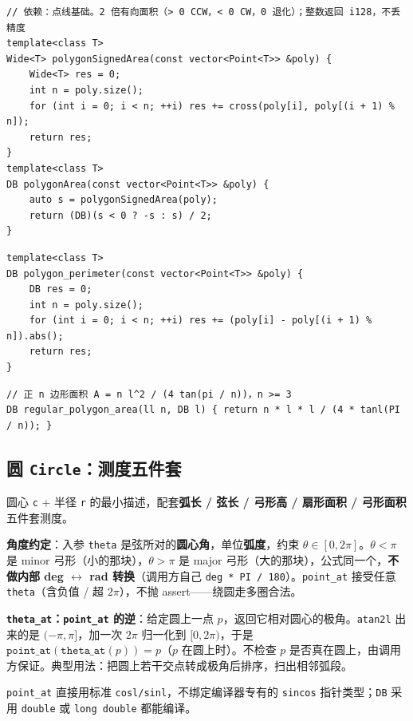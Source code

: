 \begin{verbatim}
// 依赖：点线基础。2 倍有向面积（> 0 CCW，< 0 CW，0 退化）；整数返回 i128，不丢精度
template<class T>
Wide<T> polygonSignedArea(const vector<Point<T>> &poly) {
	Wide<T> res = 0;
	int n = poly.size();
	for (int i = 0; i < n; ++i) res += cross(poly[i], poly[(i + 1) % n]);
	return res;
}
template<class T>
DB polygonArea(const vector<Point<T>> &poly) {
	auto s = polygonSignedArea(poly);
	return (DB)(s < 0 ? -s : s) / 2;
}
\end{verbatim}

\begin{verbatim}
template<class T>
DB polygon_perimeter(const vector<Point<T>> &poly) {
	DB res = 0;
	int n = poly.size();
	for (int i = 0; i < n; ++i) res += (poly[i] - poly[(i + 1) % n]).abs();
	return res;
}
\end{verbatim}

\begin{verbatim}
// 正 n 边形面积 A = n l^2 / (4 tan(pi / n))，n >= 3
DB regular_polygon_area(ll n, DB l) { return n * l * l / (4 * tanl(PI / n)); }
\end{verbatim}

		\subsection{圆 \texttt{Circle}：测度五件套}

		圆心 \texttt{c} + 半径 \texttt{r} 的最小描述，配套\textbf{弧长 / 弦长 / 弓形高 / 扇形面积 / 弓形面积}五件套测度。

		\textbf{角度约定}：入参 \texttt{theta} 是弦所对的\textbf{圆心角}，单位\textbf{弧度}，约束 $\theta \in [0, 2\pi]$。$\theta < \pi$ 是 minor 弓形（小的那块），$\theta > \pi$ 是 major 弓形（大的那块），公式同一个，\textbf{不做内部 deg $\leftrightarrow$ rad 转换}（调用方自己 \texttt{deg * PI / 180}）。\texttt{point\_at} 接受任意 \texttt{theta}（含负值 / 超 $2\pi$），不抛 assert——绕圆走多圈合法。

		\textbf{\texttt{theta\_at}：\texttt{point\_at} 的逆}：给定圆上一点 $p$，返回它相对圆心的极角。\texttt{atan2l} 出来的是 $(-\pi, \pi]$，加一次 $2\pi$ 归一化到 $[0, 2\pi)$，于是 $\texttt{point\_at}(\texttt{theta\_at}(p)) = p$（$p$ 在圆上时）。不检查 $p$ 是否真在圆上，由调用方保证。典型用法：把圆上若干交点转成极角后排序，扫出相邻弧段。

		\texttt{point\_at} 直接用标准 \texttt{cosl/sinl}，不绑定编译器专有的 \texttt{sincos} 指针类型；\texttt{DB} 采用 \texttt{double} 或 \texttt{long double} 都能编译。

